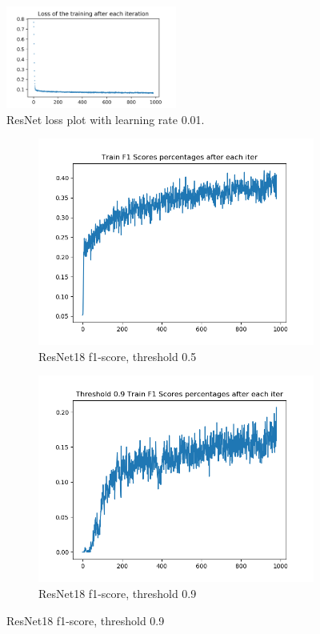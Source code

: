 \begin{figure}[!ht]
\centering
\includegraphics[width=0.5\textwidth]{resnet18-lazy-1_0-train-loss.png}
\caption{\label{resnet18:resnet18-lazy-1_0-train-loss}ResNet loss plot with learning rate 0.01.}
\end{figure}

\begin{figure}[!ht]
\centering
\begin{subfigure}{.5\textwidth}
	\centering
	\includegraphics[width=1\linewidth]{resnet18-lazy-1_0-train-scores-f1.png}
	\caption{\label{resnet18:resnet18-lazy-1.0-train-scores-f1}ResNet18 f1-score, threshold 0.5}
\end{subfigure}%
\begin{subfigure}{.5\textwidth}
	\centering
	\includegraphics[width=1\linewidth]{resnet18-lazy-1_0-train-scores-f1-9.png}
	\caption{\label{resnet18:resnet18-lazy-1.0-train-scores-f1-9}ResNet18 f1-score, threshold 0.9}
\end{subfigure}
\end{figure}
